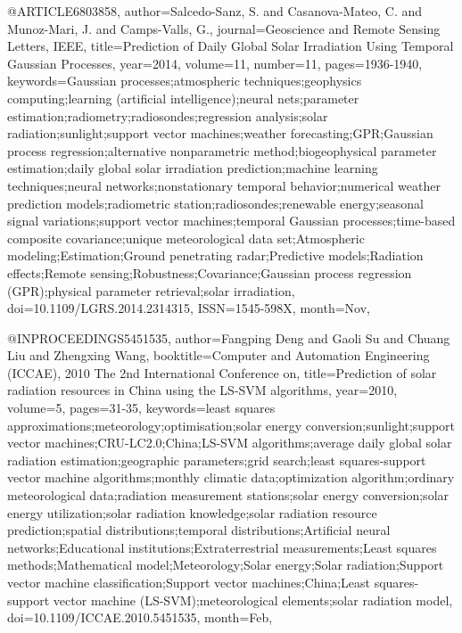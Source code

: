 {@ARTICLE{6803858, 
author={Salcedo-Sanz, S. and Casanova-Mateo, C. and Munoz-Mari, J. and Camps-Valls, G.}, 
journal={Geoscience and Remote Sensing Letters, IEEE}, 
title={Prediction of Daily Global Solar Irradiation Using Temporal Gaussian Processes}, 
year={2014}, 
volume={11}, 
number={11}, 
pages={1936-1940}, 
keywords={Gaussian processes;atmospheric techniques;geophysics computing;learning (artificial intelligence);neural nets;parameter estimation;radiometry;radiosondes;regression analysis;solar radiation;sunlight;support vector machines;weather forecasting;GPR;Gaussian process regression;alternative nonparametric method;biogeophysical parameter estimation;daily global solar irradiation prediction;machine learning techniques;neural networks;nonstationary temporal behavior;numerical weather prediction models;radiometric station;radiosondes;renewable energy;seasonal signal variations;support vector machines;temporal Gaussian processes;time-based composite covariance;unique meteorological data set;Atmospheric modeling;Estimation;Ground penetrating radar;Predictive models;Radiation effects;Remote sensing;Robustness;Covariance;Gaussian process regression (GPR);physical parameter retrieval;solar irradiation}, 
doi={10.1109/LGRS.2014.2314315}, 
ISSN={1545-598X}, 
month={Nov},}

@INPROCEEDINGS{5451535, 
author={Fangping Deng and Gaoli Su and Chuang Liu and Zhengxing Wang}, 
booktitle={Computer and Automation Engineering (ICCAE), 2010 The 2nd International Conference on}, 
title={Prediction of solar radiation resources in China using the LS-SVM algorithms}, 
year={2010}, 
volume={5}, 
pages={31-35}, 
keywords={least squares approximations;meteorology;optimisation;solar energy conversion;sunlight;support vector machines;CRU-LC2.0;China;LS-SVM algorithms;average daily global solar radiation estimation;geographic parameters;grid search;least squares-support vector machine algorithms;monthly climatic data;optimization algorithm;ordinary meteorological data;radiation measurement stations;solar energy conversion;solar energy utilization;solar radiation knowledge;solar radiation resource prediction;spatial distributions;temporal distributions;Artificial neural networks;Educational institutions;Extraterrestrial measurements;Least squares methods;Mathematical model;Meteorology;Solar energy;Solar radiation;Support vector machine classification;Support vector machines;China;Least squares-support vector machine (LS-SVM);meteorological elements;solar radiation model}, 
doi={10.1109/ICCAE.2010.5451535}, 
month={Feb},}

}
